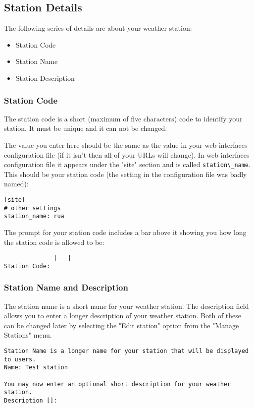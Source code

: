\documentclass[a4paper,10pt,draft]{book}
\begin{document}
\subsection{Station Details}
The following series of details are about your weather station:
\begin{itemize}
\item Station Code
\item Station Name
\item Station Description
\end{itemize}

\subsubsection{Station Code}
The station code is a short (maximum of five characters) code to identify your station. It must be unique and it can not be changed.

The value you enter here should be the same as the value in your web interfaces configuration file (if it isn't then all of your URLs will change). In web interfaces configuration file it appears under the "site" section and is called \verb|station\_name|. This should be your station code (the setting in the configuration file was badly named):
\begin{verbatim}
[site]
# other settings
station_name: rua
\end{verbatim}

The prompt for your station code includes a bar above it showing you how long the station code is allowed to be:
\begin{verbatim}
              |---|
Station Code:
\end{verbatim}

\subsubsection{Station Name and Description}
The station name is a short name for your weather station. The description field allows you to enter a longer description of your weather station. Both of these can be changed later by selecting the "Edit station" option from the "Manage Stations" menu.

\begin{verbatim}
Station Name is a longer name for your station that will be displayed 
to users.
Name: Test station

You may now enter an optional short description for your weather
station.
Description []:
\end{verbatim}
\end{document}
